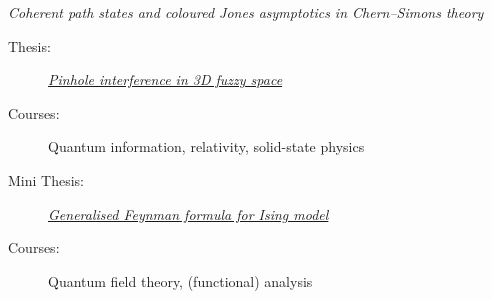 
\begin{description}[style=sameline,labelwidth=\widthof{\textbf{Thesis:}},leftmargin=!]
    \item[Thesis:] \textit{Coherent path states and coloured Jones asymptotics\newline
	in Chern--Simons theory}
\end{description}

\divider

\begin{description}
    \item[Thesis:] \href{https://doi.org/10019.1/126944}{\textit{Pinhole interference in 3D fuzzy space}}
    \ifindustry\else %
        \item[Courses:] Quantum information, relativity, solid-state physics
    \fi %
\end{description}

\divider

\begin{description}
    \item[Mini Thesis:] \href{https://doi.org/10.5281/zenodo.8414170}{\textit{Generalised Feynman formula for Ising model}}
    \ifindustry\else %
        \item[Courses:] Quantum field theory, (functional) analysis
    \fi %
\end{description}

\divider

